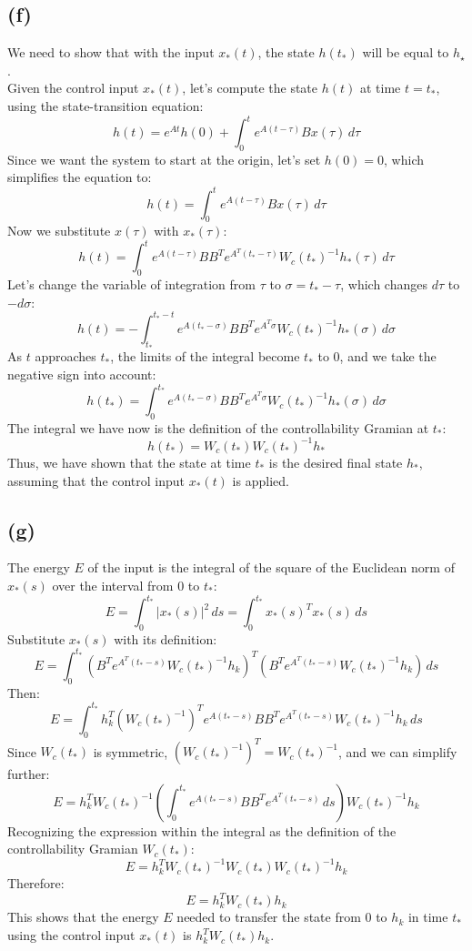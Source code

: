\documentclass[12pt]{article}
\begin{document}
\subsection*{(f)}
We need to show that with the input $x_*(t)$, the state $h(t_*)$ will be equal to $h_\star$.\\
Given the control input \( x_*(t) \), let's compute the state \( h(t) \) at time \( t = t_* \), using the state-transition equation:
\[
h(t) = e^{A t} h(0) + \int_{0}^{t} e^{A(t-\tau)} Bx(\tau) \, d\tau
\]
Since we want the system to start at the origin, let's set \( h(0) = 0 \), which simplifies the equation to:
\[
h(t) = \int_{0}^{t} e^{A(t-\tau)} Bx(\tau) \, d\tau
\]
Now we substitute \( x(\tau) \) with \( x_*(\tau) \):
\[
h(t) = \int_{0}^{t} e^{A(t-\tau)} BB^T e^{A^T(t_*-\tau)} W_c(t_*)^{-1} h_*(\tau) \, d\tau
\]
Let's change the variable of integration from \( \tau \) to \( \sigma = t_* - \tau \), which changes \( d\tau \) to \( -d\sigma \):
\[
h(t) = - \int_{t_*}^{t_*-t} e^{A(t_*-\sigma)} BB^T e^{A^T\sigma} W_c(t_*)^{-1} h_*(\sigma) \, d\sigma
\]
As \( t \) approaches \( t_* \), the limits of the integral become \( t_* \) to 0, and we take the negative sign into account:
\[
h(t_*) = \int_{0}^{t_*} e^{A(t_*-\sigma)} BB^T e^{A^T\sigma} W_c(t_*)^{-1} h_*(\sigma) \, d\sigma
\]
The integral we have now is the definition of the controllability Gramian at \( t_* \):
\[
h(t_*) = W_c(t_*) W_c(t_*)^{-1} h_*
\]
Thus, we have shown that the state at time \( t_* \) is the desired final state \( h_* \), assuming that the control input \( x_*(t) \) is applied.

\subsection*{(g)}
The energy \( E \) of the input is the integral of the square of the Euclidean norm of \( x_*(s) \) over the interval from \( 0 \) to \( t_* \):
\[
E = \int_{0}^{t_*} | x_*(s) |^2 \, ds = \int_{0}^{t_*} x_*(s)^T x_*(s) \, ds
\]
Substitute \( x_*(s) \) with its definition:
\[
E = \int_{0}^{t_*} (B^T e^{A^T(t_*-s)} W_c(t_*)^{-1} h_k)^T (B^T e^{A^T(t_*-s)} W_c(t_*)^{-1} h_k) \, ds
\]
Then:
\[
E = \int_{0}^{t_*} h_k^T (W_c(t_*)^{-1})^T e^{A(t_*-s)} BB^T e^{A^T(t_*-s)} W_c(t_*)^{-1} h_k \, ds
\]
Since \( W_c(t_*) \) is symmetric, \( (W_c(t_*)^{-1})^T = W_c(t_*)^{-1} \), and we can simplify further:
\[
E = h_k^T W_c(t_*)^{-1} \left( \int_{0}^{t_*} e^{A(t_*-s)} BB^T e^{A^T(t_*-s)} \, ds \right) W_c(t_*)^{-1} h_k
\]
Recognizing the expression within the integral as the definition of the controllability Gramian \( W_c(t_*) \):
\[
E = h_k^T W_c(t_*)^{-1} W_c(t_*) W_c(t_*)^{-1} h_k
\]
Therefore:
\[
E = h_k^T W_c(t_*) h_k
\]
This shows that the energy \( E \) needed to transfer the state from \( 0 \) to \( h_k \) in time \( t_* \) using the control input \( x_*(t) \) is \( h_k^T W_c(t_*) h_k \).
\end{document}
